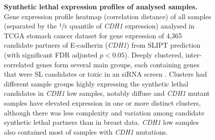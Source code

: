 \begin{figure}[!ht]
\begin{mdframed}
  \centering
    \caption[Synthetic lethal expression profiles of stomach samples]{\small \textbf{Synthetic lethal expression profiles of analysed samples.} Gene expression profile heatmap (correlation distance) of all samples (separated by the $\sfrac{1}{3}$ quantile of \textit{CDH1} expression) analysed in TCGA stomach cancer dataset for gene expression of 4,365 candidate partners of E-cadherin (\textit{CDH1}) from SLIPT prediction (with significant FDR adjusted $p < 0.05$). Deeply clustered, inter-correlated genes form several main groups, each containing genes that were SL candidates or toxic in an siRNA screen \cite{Telford2015}. Clusters had different sample groups highly expressing the synthetic lethal candidates in \textit{CDH1} low samples, notably diffuse and \textit{CDH1} mutant samples have elevated expression in one or more distinct clusters, although there was less complexity and variation among candidate synthetic lethal partners than in breast data. \textit{CDH1} low samples also contained most of samples with \textit{CDH1} mutations.
}
\label{fig:slipt_expr_stad}
\end{mdframed}
\end{figure}

